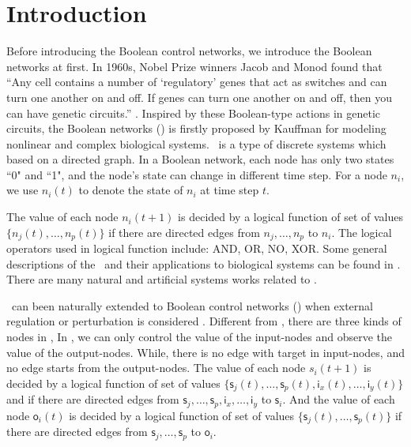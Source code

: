 \section{Introduction}
\label{sec:intro}


Before introducing the Boolean control networks, we introduce the Boolean networks at first. In 1960s, Nobel Prize winners Jacob and Monod found that ``Any cell contains a number of `regulatory' genes that act as switches and can turn one another on and off. If genes can turn one another on and off, then you can have genetic circuits.'' \cite{Jacob1961Genetic}. Inspired by these Boolean-type actions in genetic circuits, the Boolean networks (\BNs) is firstly proposed by Kauffman \cite{Kauffman1968Metabolic} for modeling nonlinear and complex biological systems. \BNs\ is a type of discrete systems which based on a directed graph. In a Boolean network, each node has only two states ``0" and ``1", and
the node's state     can change in different  time step.  For a node $n_i$, we use $n_i(t)$ to denote the state of $n_i$ at time step $t$.

The value of each node $n_i(t+1)$ is decided by a logical function of  set of  values  $\{n_j(t),\ldots,n_p(t)\}$ if  there are directed edges from $n_j,\ldots,n_p$ to $n_i$.%
The logical operators used in  logical function include: AND, OR, NO, XOR. Some general descriptions of the \BNs\ and their applications to biological systems can be found in \cite{Kauffman1968Metabolic}.
There are many natural and artificial systems works \cite{Akutsu2000Inferring, Shmulevich2002From, Faur2006Dynamical,Green2007The,Lou2010Multi} related to \BNs.
 

         \BNs\ can been naturally extended to Boolean control networks (\BCNs) when external regulation or perturbation is considered \cite{Ideker2001A}. Different from \BNs, there are three kinds of nodes in \BCNs,  In \BCNs, we can only control the value of the input-nodes and observe the value of the output-nodes. While, there is no edge with target in input-nodes, and no edge starts from the output-nodes. The value of each node $s_i(t+1)$ is decided by a logical function of set of  values  $\{\mathsf{s}_j(t),\ldots,\mathsf{s}_p(t),\mathsf{i}_x(t),\ldots,\mathsf{i}_y(t)\}$ and if there are directed edges from $\mathsf{s}_j,\ldots,\mathsf{s}_p,\mathsf{i}_x,\ldots,\mathsf{i}_y$ to $\mathsf{s}_i$. And the value of each node $\mathsf{o}_i(t)$ is decided by a logical function of  set of  values  $\{\mathsf{s}_j(t),\ldots,\mathsf{s}_p(t)\}$ if  there are directed edges from $\mathsf{s}_j,\ldots,\mathsf{s}_p$ to $\mathsf{o}_i$.

